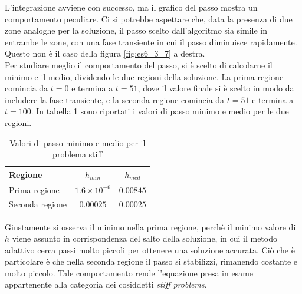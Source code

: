\documentclass[letterpaper, 12pt]{article}
\numberwithin{equation}{section}    %
\begin{document}
L'integrazione avviene con successo, ma il grafico del passo mostra un comportamento peculiare. Ci si potrebbe
aspettare che, data la presenza di due zone analoghe per la soluzione, il passo scelto dall'algoritmo
sia simile in entrambe le zone, con una fase transiente in cui il passo diminuisce rapidamente.
Questo non è il caso della figura \ref{fig:es6_3_7} a destra.\\
Per studiare meglio il comportamento del passo, si è scelto di calcolarne il minimo e il medio, 
dividendo le due regioni della soluzione. La prima regione comincia da $t=0$ e termina a $t=51$, dove
il valore finale si è scelto in modo da includere la fase transiente, e la seconda regione comincia da $t=51$ 
e termina a $t=100$.
In tabella \ref{tab:passi_stiff} sono riportati i valori di passo minimo e medio per le due regioni. \\
\begin{table}[!ht]
    \centering
    \caption{Valori di passo minimo e medio per il problema stiff}
    \label{tab:passi_stiff}
    \begin{tabular}{|l|c|c|}
        \hline
        \textbf{Regione} & \textbf{$h_{min}$} & \textbf{$h_{med}$} \\
        \hline
        Prima regione & $1.6 \times 10^{-6}$ & $0.00845$ \\
        Seconda regione & $0.00025$ & $ 0.00025$ \\
        \hline
    \end{tabular}
\end{table}
Giustamente si osserva il minimo nella prima regione, perchè il minimo valore di $h$ viene assunto in 
corrispondenza del salto della soluzione, in cui il metodo adattivo cerca passi molto piccoli per 
ottenere una soluzione accurata. Ciò che è particolare è che nella seconda regione il passo si stabilizzi, 
rimanendo costante e molto piccolo. Tale comportamento rende l'equazione presa in esame appartenente alla 
categoria dei cosiddetti \textit{stiff problems}. 

\newpage
\end{document}
